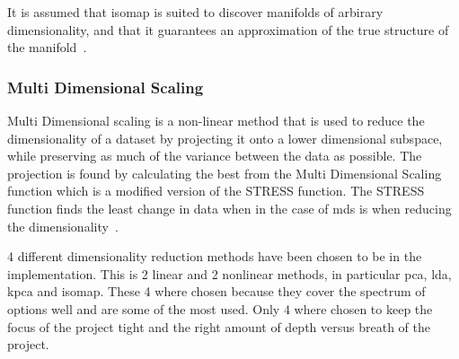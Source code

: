 It is assumed that \gls{isomap} is suited to discover manifolds of arbirary dimensionality, and that it guarantees an approximation of the true structure of the manifold~\cite{tennenbaum}.


\subsubsection{Multi Dimensional Scaling}\label{subsubsec:multi-dimensional-scaling}
Multi Dimensional scaling is a non-linear method that is used to reduce the dimensionality of a dataset by projecting it onto a lower dimensional subspace, while preserving as much of the variance between the data as possible. The projection is found by calculating the best from the Multi Dimensional Scaling function which is a modified version of the STRESS function. The STRESS function finds the least change in data when in the case of \gls{mds} is when reducing the dimensionality~\cite{multi-dimensional-scaling-leeuw}.



4 different dimensionality reduction methods have been chosen to be in the implementation. This is 2 linear and 2 nonlinear methods, in particular \gls{pca}, \gls{lda}, \gls{kpca} and \gls{isomap}. These 4 where chosen because they cover the spectrum of options well and are some of the most used. Only 4 where chosen to keep the focus of the project tight and the right amount of depth versus breath of the project.






